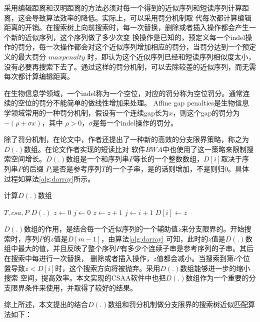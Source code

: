 采用编辑距离和汉明距离的方法必须对每一个得到的近似序列和短读序列计算距离，这会导致算法效率的降低。实际上，可以采用罚分机制取
代每次都计算编辑距离的开销。在搜索树上向前搜索时，每一次替换，删除或者插入操作都会产生一个新的近似序列，这个序列做了多少次变
换操作是已知的，预定义每一个indel操作的罚分，每一次操作都会对这个近似序列增加相应的罚分，当罚分达到一个预定义的最大罚分
$maxpenalty$
时，即认为这个近似序列已经和短读序列相似度太小，没有必要再搜索下去了。通过这样的罚分机制，可以去除较差的近似序列，而无需
每次都计算编辑距离。

在生物信息学领域，一个indel称为一个空位，对应的罚分称为空位罚分。通常连续的空位的罚分不能简单的做线性增加来处理。
Affine gap penalties是生物信息学领域常用的一种罚分机制，假设有一个连续gap长为$x$，则这个gap的罚分为$-(\rho +\sigma x)$，其中
$\rho >0$，$\sigma$是每一个indel操作的罚分。

除了罚分机制，在论文\cite{li2009fast}中，作者还提出了一种新的高效的分支限界策略，称之为$D(.)$数组。在论文作者实现的短读比对
软件$BWA$中也使用了这一策略来限制搜索空间增长。$D(.)$数组是一个和序列串$P$等长的一个整数数组，$D[i]$取决于序列串$P$的后缀
$P_i$是否是参考序列$T$的一个子串，是的话则增加，不是则归0。具体过程如算法\ref{alg:darray}所示。

\begin{algorithm}
    \caption{计算$D(.)$数组}
    \label{alg:darray}
    \begin{algorithmic}[1]
        \Require $T,csa,P$
        \Ensure $D(.)$
            \State $z \gets 0$
            \State $j \gets 0$
                    \State $z \gets z+1$
                    \State $j \gets i+1$
                \EndIf
                \State $D[i] \gets z$
            \EndFor
        \EndFunction
    \end{algorithmic}
\end{algorithm}

$D(.)$数组的作用，是结合每一个近似序列的一个辅助值$z$来分支限界的。开始搜索时，序列$P$的$z$值是$D[m-1]$，由算法\ref{alg:darray}
可知，此时的$z$值是$D(.)$数组中最大的值，并且反映了整个序列$P$有多少个连续子串是参考序列的子串。其后在搜索中每进行一次替换，
删除或者插入操作，$z$值都会减小。当搜索到第$i$个位置导致$z<D[i]$时，这个搜索方向将被抛弃。采用$D(.)$数组能够进一步的缩小搜索
空间，提高效率。本文实现的CSAA软件中也把$D(.)$数组作为一个重要的分支限界条件来使用，并取得了较好的结果。

综上所述，本文提出的结合$D(.)$数组和罚分机制做分支限界的搜索树近似匹配算法如下：

